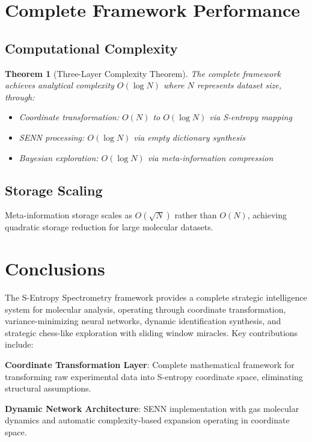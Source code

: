\documentclass[12pt,a4paper]{article}
\newtheorem{theorem}{Theorem}
\begin{document}
\section{Complete Framework Performance}

\subsection{Computational Complexity}

\begin{theorem}[Three-Layer Complexity Theorem]
The complete framework achieves analytical complexity $O(\log N)$ where $N$ represents dataset size, through:
\begin{itemize}
\item Coordinate transformation: $O(N)$ to $O(\log N)$ via S-entropy mapping
\item SENN processing: $O(\log N)$ via empty dictionary synthesis  
\item Bayesian exploration: $O(\log N)$ via meta-information compression
\end{itemize}
\end{theorem}

\subsection{Storage Scaling}

Meta-information storage scales as $O(\sqrt{N})$ rather than $O(N)$, achieving quadratic storage reduction for large molecular datasets.

\section{Conclusions}

The S-Entropy Spectrometry framework provides a complete strategic intelligence system for molecular analysis, operating through coordinate transformation, variance-minimizing neural networks, dynamic identification synthesis, and strategic chess-like exploration with sliding window miracles. Key contributions include:

\textbf{Coordinate Transformation Layer}: Complete mathematical framework for transforming raw experimental data into S-entropy coordinate space, eliminating structural assumptions.

\textbf{Dynamic Network Architecture}: SENN implementation with gas molecular dynamics and automatic complexity-based expansion operating in coordinate space.
\end{document}
